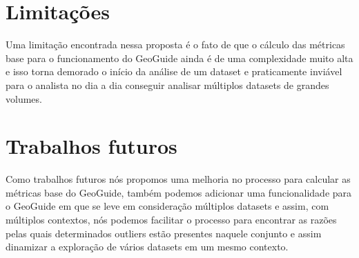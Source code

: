 \section{Limitações}

Uma limitação encontrada nessa proposta é o fato de que o cálculo das métricas base para o funcionamento do GeoGuide ainda é de uma complexidade muito alta e isso torna demorado o início da análise de um dataset e praticamente inviável para o analista no dia a dia conseguir analisar múltiplos datasets de grandes volumes.

\section{Trabalhos futuros}

Como trabalhos futuros nós propomos uma melhoria no processo para calcular as métricas base do GeoGuide, também podemos adicionar uma funcionalidade para o GeoGuide em que se leve em consideração múltiplos datasets e assim, com múltiplos contextos, nós podemos facilitar o processo para encontrar as razões pelas quais determinados outliers estão presentes naquele conjunto e assim dinamizar a exploração de vários datasets em um mesmo contexto. 
